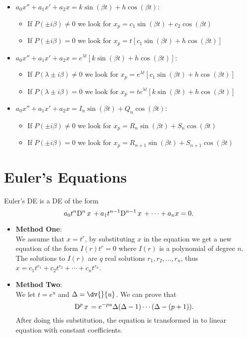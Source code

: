 \begin{itemize}
\begin{itemize}
	      \end{itemize}
	\item $a_0x'' +a_1x' + a_2x = k\sin(\beta t)+h\cos(\beta t)$:
	      \begin{itemize}
		      \item If $P(\pm i\beta)\neq0$ we look for $x_p=c_1\sin(\beta t)+c_2\cos(\beta t)$
		      \item If $P(\pm i\beta)=0$ we look for $x_p=t\left[c_1\sin(\beta t)+h\cos(\beta t)\right]$
	      \end{itemize}
	\item $a_0x'' +a_1x' + a_2x = e^{\lambda t}\left[k\sin(\beta t)+h\cos(\beta t)\right]$:
	      \begin{itemize}
		      \item If $P(\lambda \pm i\beta)\neq0$ we look for $x_p=e^{\lambda t}\left[c_1\sin(\beta t)+h\cos(\beta t)\right]$
		      \item If $P(\lambda \pm i\beta)=0$ we look for $x_p=te^{\lambda t}\left[k\sin(\beta t)+h\cos(\beta t)\right]$
	      \end{itemize}
	\item $a_0x'' +a_1x' + a_2x = I_n\sin(\beta t)+Q_n\cos(\beta t)$:
	      \begin{itemize}
		      \item If $P(\pm i\beta)\neq0$ we look for $x_p=R_n\sin(\beta t)+S_n\cos(\beta t)$
		      \item If $P(\pm i\beta)=0$ we look for $x_p=R_{n+1}\sin(\beta t)+S_{n+1}\cos(\beta t)$
	      \end{itemize}
\end{itemize}

\section{Euler's Equations}
Euler's DE is a DE of the form
\[
	a_0t^n\D[n]{x}+a_1t^{n-1}\D[n-1]{x} + \cdots + a_nx = 0
	.\]

\begin{itemize}
	\item \textbf{Method One}:\\
	      We assume that $x=t^r$, by substituting $x$ in the equation we get a new equation of the form $I(r)t^r=0$ where $I(r)$ is a polynomial of degree $n$. The solutions to $I(r)$ are $q$ real solutions $r_1,r_2,\ldots,r_n$, thus $x = c_1t^{r_1} + c_2t^{r_2} + \cdots + c_n t^{r_n}$.
	\item \textbf{Method Two}:\\
	      We let $t=e^u$ and $\Delta = \dv{}{u}$. We can prove that
	      \[
		      \D[p]{x} = e^{-p u}\Delta(\Delta-1)\cdots(\Delta-(p+1))
		      .\]
	      After doing this substitution, the equation is transformed in to linear equation with constant coefficients.
\end{itemize}

